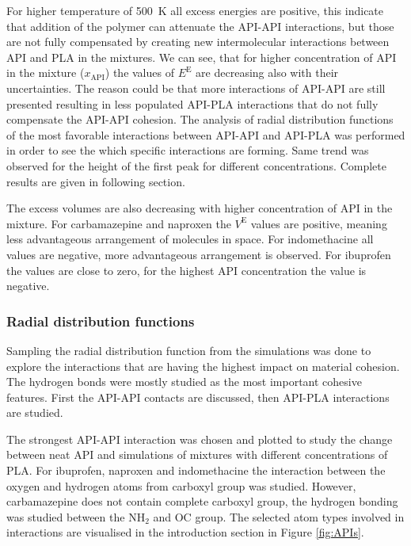 \vspace{-0.2cm}
For higher temperature of 500~K all excess energies are positive, this indicate that addition of the polymer can attenuate the API-API interactions, but those are not fully compensated by creating new intermolecular interactions between API and PLA in the mixtures. We can see, that for higher concentration of API in the mixture ($x_{\text{API}}$) the values of $E^\text{E}$ are decreasing also with their uncertainties. The reason could be that more interactions of API-API are still presented resulting in less populated API-PLA interactions that do not fully compensate the API-API cohesion. The analysis of radial distribution functions of the most favorable interactions between API-API and API-PLA was performed in order to see the which specific interactions are forming. Same trend was observed for the height of the first peak for different concentrations. Complete results are given in following section.

The excess volumes are also decreasing with higher concentration of API in the mixture. For carbamazepine and naproxen the $V^\text{E}$ values are positive, meaning less advantageous arrangement of molecules in space. For indomethacine all values are negative, more advantageous arrangement is observed. For ibuprofen the values are close to zero, for the highest API concentration the value is negative.

\vspace{-0.1cm}

\subsubsection{Radial distribution functions}
\vspace{-0.2cm}
Sampling the radial distribution function from the simulations was done to explore the interactions that are having the highest impact on material cohesion. The hydrogen bonds were mostly studied as the most important cohesive features. First the API-API contacts are discussed, then API-PLA interactions are studied.

The strongest API-API interaction was chosen and plotted to study the change between neat API and simulations of mixtures with different concentrations of PLA. For ibuprofen, naproxen and indomethacine the interaction between the oxygen and hydrogen atoms from carboxyl group was studied. However, carbamazepine does not contain complete carboxyl group, the hydrogen bonding was studied between the N$\text{H}_\text{2}$ and OC group. The selected atom types involved in interactions are visualised in the introduction section in Figure \ref{fig:APIs}. 

